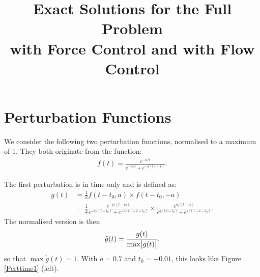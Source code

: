 \documentclass[11pt, a4paper]{article}
\title{Exact Solutions for the Full Problem \\with Force Control and with Flow Control}
\date{}
\theoremstyle{definition}
\begin{document}
\section{Perturbation Functions}
We consider the following two perturbation functions, normalised to a maximum of 1. They both originate from the function:
\begin{align*}
f(t) = \frac{e^{-a/t}}{e^{-a/t} + e^{-a/(1-t)}}.
\end{align*}

The first perturbation is in time only and is defined as:
\begin{align*}
g(t) &= \frac{1}{2} f(t-t_0, a) \times f(t-t_0, -a)\\
     &= \frac{1}{2} \frac{e^{-a/(t-t_0)}}{e^{-a/(t-t_0)} + e^{-a/(1-t -t_0)}} \times \frac{e^{a/(t-t_0)}}{e^{a/(t-t_0)} + e^{a/(1-t - t_0)}}.
\end{align*}
The normalised version is then 
\begin{align*}
\tilde g(t) = \frac{g(t)}{\max{\abs{g(t)}}},
\end{align*}
so that $\max{\tilde g(t)} =1$.
With $a = 0.7$ and $t_0 = -0.01$, this looks like Figure \ref{Perttime1} (left).
\end{document}
